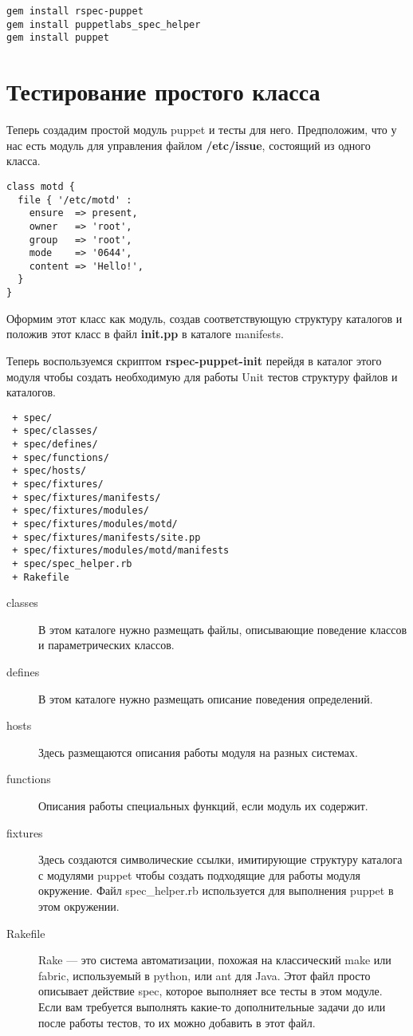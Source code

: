 \begin{verbatim}
gem install rspec-puppet
gem install puppetlabs_spec_helper
gem install puppet
\end{verbatim}

\section{Тестирование простого класса}

Теперь создадим простой модуль puppet и тесты для него. Предположим, что у нас есть модуль для управления файлом \textbf{/etc/issue}, состоящий из одного класса.

\begin{lstlisting}
class motd {
  file { '/etc/motd' :
    ensure  => present,
    owner   => 'root',
    group   => 'root',
    mode    => '0644',
    content => 'Hello!',
  }
}
\end{lstlisting}

Оформим этот класс как модуль, создав соответствующую структуру каталогов и положив этот класс в файл \textbf{init.pp} в каталоге manifests.


Теперь воспользуемся скриптом \textbf{rspec-puppet-init} перейдя в каталог этого модуля чтобы создать необходимую для работы Unit тестов структуру файлов и каталогов.

\begin{verbatim}
 + spec/
 + spec/classes/
 + spec/defines/
 + spec/functions/
 + spec/hosts/
 + spec/fixtures/
 + spec/fixtures/manifests/
 + spec/fixtures/modules/
 + spec/fixtures/modules/motd/
 + spec/fixtures/manifests/site.pp
 + spec/fixtures/modules/motd/manifests
 + spec/spec_helper.rb
 + Rakefile
\end{verbatim}

\begin{description}
\item[classes] В этом каталоге нужно размещать файлы, описывающие поведение классов и параметрических классов.
\item[defines] В этом каталоге нужно размещать описание поведения определений.
\item[hosts] Здесь размещаются описания работы модуля на разных системах.
\item[functions] Описания работы специальных функций, если модуль их содержит.
\item[fixtures] Здесь создаются символические ссылки, имитирующие структуру каталога с модулями puppet чтобы создать подходящие для работы модуля окружение. Файл spec\_helper.rb используется для выполнения puppet в этом окружении.
\item[Rakefile] Rake --- это система автоматизации, похожая на классический make или fabric, используемый в python, или ant для Java. Этот файл просто описывает действие spec, которое выполняет все тесты в этом модуле. Если вам требуется выполнять какие-то дополнительные задачи до или после работы тестов, то их можно добавить в этот файл.
\end{description}

